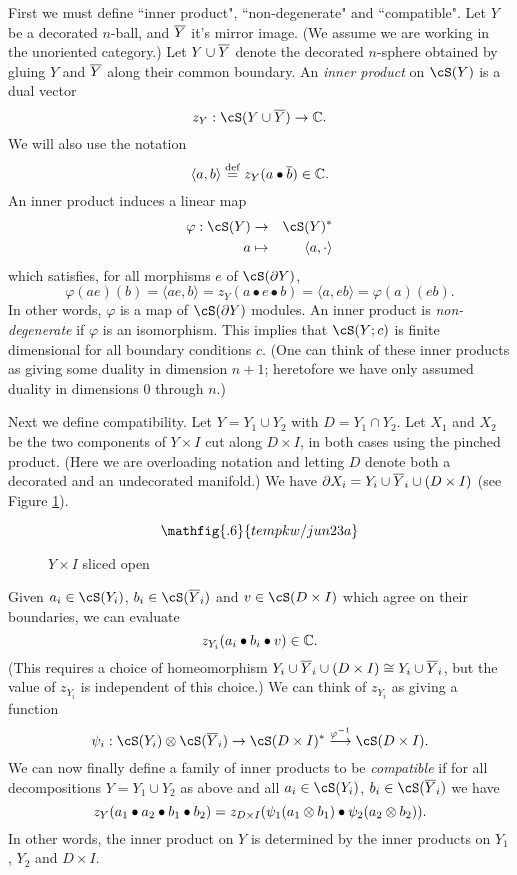 First we must define ``inner product", ``non-degenerate" and ``compatible".
Let $Y$ be a decorated $n$-ball, and $\overline{Y}$ it's mirror image.
(We assume we are working in the unoriented category.)
Let $Y\cup\overline{Y}$ denote the decorated $n$-sphere obtained by gluing $Y$ and $\overline{Y}$
along their common boundary.
An {\it inner product} on $\cS(Y)$ is a dual vector
\[
	z_Y : \cS(Y\cup\ol{Y}) \to \c.
\]
We will also use the notation
\[
	\langle a, b\rangle \stackrel{\mathrm{def}}{=} z_Y(a\bullet \overline{b}) \in \mathbb{C} .
\]
An inner product induces a linear map
\begin{eqnarray*}
	\varphi: \cS(Y) &\to& \cS(Y)^* \\
	a &\mapsto& \langle a, \cdot \rangle
\end{eqnarray*}
which satisfies, for all morphisms $e$ of $\cS(\bd Y)$,
\[
	\varphi(ae)(b) = \langle ae, b \rangle = z_Y(a\bullet e\bullet b) = 
			\langle a, eb \rangle = \varphi(a)(eb) .
\]
In other words, $\varphi$ is a map of $\cS(\bd Y)$ modules.
An inner product is {\it non-degenerate} if $\varphi$ is an isomorphism.
This implies that $\cS(Y; c)$ is finite dimensional for all boundary conditions $c$.
(One can think of these inner products as giving some duality in dimension $n{+}1$;
heretofore we have only assumed duality in dimensions 0 through $n$.)

Next we define compatibility.
Let $Y = Y_1\cup Y_2$ with $D = Y_1\cap Y_2$.
Let $X_1$ and $X_2$ be the two components of $Y\times I$ cut along
$D\times I$, in both cases using the pinched product.
(Here we are overloading notation and letting $D$ denote both a decorated and an undecorated
manifold.)
We have $\partial X_i = Y_i \cup \overline{Y}_i \cup (D\times I)$
(see Figure \ref{jun23a}).
\begin{figure}[t]
\begin{equation*}
\mathfig{.6}{tempkw/jun23a}
\end{equation*}
\caption{$Y\times I$ sliced open}
\label{jun23a}
\end{figure}
Given $a_i\in \cS(Y_i)$, $b_i\in \cS(\ol{Y}_i)$ and $v\in\cS(D\times I)$
which agree on their boundaries, we can evaluate
\[
	z_{Y_i}(a_i\bullet b_i\bullet v) \in \mathbb{C} .
\]
(This requires a choice of homeomorphism $Y_i \cup \overline{Y}_i \cup (D\times I) \cong
Y_i \cup \overline{Y}_i$, but the value of $z_{Y_i}$ is independent of this choice.)
We can think of $z_{Y_i}$ as giving a function
\[
	\psi_i : \cS(Y_i) \ot \cS(\ol{Y}_i) \to \cS(D\times I)^* 
					\stackrel{\varphi\inv}{\longrightarrow} \cS(D\times I) .
\]
We can now finally define a family of inner products to be {\it compatible} if
for all decompositions $Y = Y_1\cup Y_2$ as above and all $a_i\in \cS(Y_i)$, $b_i\in \cS(\ol{Y}_i)$
we have
\[
	z_Y(a_1\bullet a_2\bullet b_1\bullet b_2) = 
				z_{D\times I}(\psi_1(a_1\otimes b_1)\bullet \psi_2(a_2\otimes b_2)) .
\]
In other words, the inner product on $Y$ is determined by the inner products on
$Y_1$, $Y_2$ and $D\times I$.

